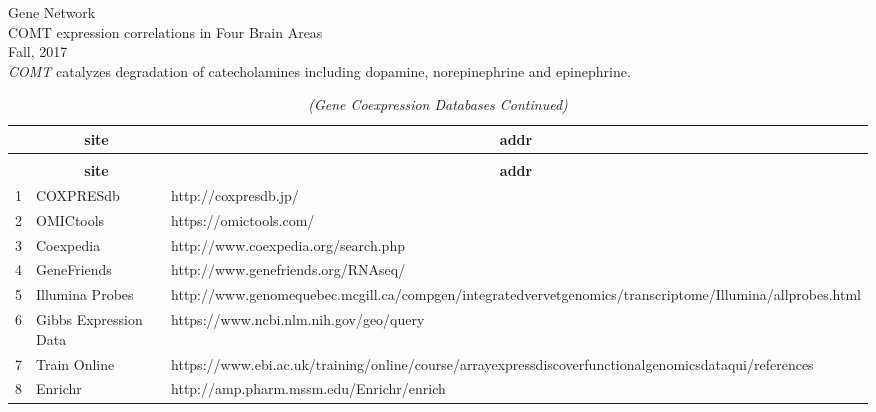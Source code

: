 %
%
%
%





\usepackage{Sweave}


 

\hspace{-1.5em}Gene Network\\
COMT expression correlations in Four Brain Areas\\
Fall, 2017\\





{\textit {COMT}} catalyzes degradation of catecholamines including dopamine, norepinephrine and epinephrine.\\ 
\setlongtables\begin{longtable}{lll}\caption{Gene Coexpression Databases} \tabularnewline
\toprule
\multicolumn{1}{l}{\bfseries }&\multicolumn{1}{c}{\bfseries site}&\multicolumn{1}{c}{\bfseries addr}\tabularnewline
\midrule
\endfirsthead\caption[]{\em (Gene Coexpression Databases Continued)} \tabularnewline
\midrule
\multicolumn{1}{l}{\bfseries }&\multicolumn{1}{c}{\bfseries site}&\multicolumn{1}{c}{\bfseries addr}\tabularnewline
\midrule
\endhead
\midrule
\endfoot
\label{tabcoexpressurls}
1&COXPRESdb&http://coxpresdb.jp/\tabularnewline
2&OMICtools&https://omictools.com/\tabularnewline
3&Coexpedia&http://www.coexpedia.org/search.php\tabularnewline
4&GeneFriends&http://www.genefriends.org/RNAseq/\tabularnewline
5&Illumina Probes&http://www.genomequebec.mcgill.ca/compgen/integratedvervetgenomics/transcriptome/Illumina/allprobes.html\tabularnewline
6&Gibbs Expression Data&https://www.ncbi.nlm.nih.gov/geo/query\tabularnewline
7&Train Online&https://www.ebi.ac.uk/training/online/course/arrayexpressdiscoverfunctionalgenomicsdataqui/references\tabularnewline
8&Enrichr&http://amp.pharm.mssm.edu/Enrichr/enrich\tabularnewline
\bottomrule
\end{longtable}









